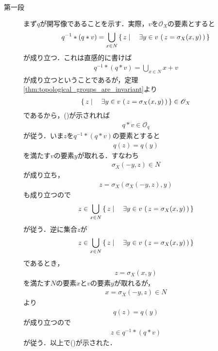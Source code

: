 	\begin{sketch}\mbox{}
		\begin{description}
			\item[第一段] まず$q$が開写像であることを示す．実際，$v$を$\mathscr{O}_X$の要素とすると
				\begin{align}
					q^{-1} \ast (q \ast v) = \bigcup_{x \in N} \left\{\, z \mid \quad \exists y \in v\, \left(\, z=\sigma_X(x,y)\, \right)\, \right\}
					\label{fom:thm_quotient_topological_vector_space_1}
				\end{align}
				が成り立つ．これは直感的に書けば
				\begin{align}
					q^{-1} \ast (q \ast v) = \bigcup_{x \in N} x + v
				\end{align}
				が成り立つということであるが，定理\ref{thm:topological_groups_are_invariant}より
				\begin{align}
					\left\{\, z \mid \quad \exists y \in v\, \left(\, z=\sigma_X(x,y)\, \right)\, \right\} \in \mathscr{O}_X
				\end{align}
				であるから，()が示されれば
				\begin{align}
					q \ast v \in \mathscr{O}_q
				\end{align}
				が従う．いま$z$を$q^{-1} \ast (q \ast v)$の要素とすると
				\begin{align}
					q(z) = q(y)
				\end{align}
				を満たす$v$の要素$y$が取れる．すなわち
				\begin{align}
					\sigma_X(-y,z) \in N
				\end{align}
				が成り立ち，
				\begin{align}
					z = \sigma_X\left(\sigma_X(-y,z),y\right)
				\end{align}
				も成り立つので
				\begin{align}
					z \in \bigcup_{x \in N} \left\{\, z \mid \quad \exists y \in v\, \left(\, z=\sigma_X(x,y)\, \right)\, \right\}
				\end{align}
				が従う．逆に集合$z$が
				\begin{align}
					z \in \bigcup_{x \in N} \left\{\, z \mid \quad \exists y \in v\, \left(\, z=\sigma_X(x,y)\, \right)\, \right\}
				\end{align}
				であるとき，
				\begin{align}
					z = \sigma_X(x,y)
				\end{align}
				を満たす$N$の要素$x$と$v$の要素$y$が取れるが，
				\begin{align}
					x = \sigma_X(-y,z) \in N
				\end{align}
				より
				\begin{align}
					q(z) = q(y)
				\end{align}
				が成り立つので
				\begin{align}
					z \in q^{-1} \ast (q \ast v)
				\end{align}
				が従う．以上で()が示された．
				

\end{description}
\end{sketch}
